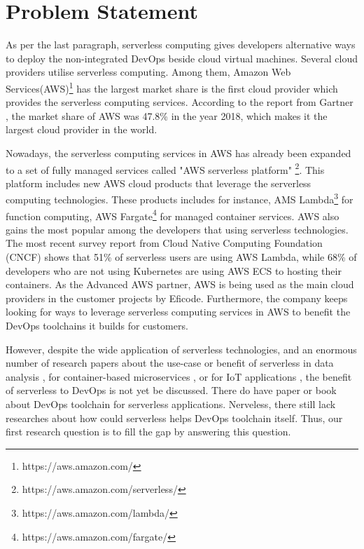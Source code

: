 \section{Problem Statement}
As per the last paragraph, serverless computing gives developers alternative ways to deploy the non-integrated DevOps beside cloud virtual machines. Several cloud providers utilise serverless computing. Among them, Amazon Web Services(AWS)\footnote{https://aws.amazon.com/} has the largest market share is the first cloud provider which provides the serverless computing services. According to the report from Gartner \cite{GartnerS47:online}, the market share of AWS was 47.8\% in the year 2018, which makes it the largest cloud provider in the world.
\par
Nowadays, the serverless computing services in AWS has already been expanded to a set of fully managed services called "AWS serverless platform" \footnote{https://aws.amazon.com/serverless/}. This platform includes new AWS cloud products that leverage the serverless computing technologies. These products includes for instance, AMS Lambda\footnote{https://aws.amazon.com/lambda/} for function computing, AWS Fargate\footnote{https://aws.amazon.com/fargate/} for managed container services.
AWS also gains the most popular among the developers that using serverless technologies. The most recent survey report \cite{cncf2020} from Cloud Native Computing Foundation (CNCF) shows that 51\% of serverless users are using AWS Lambda, while 68\% of developers who are not using Kubernetes are using AWS ECS to hosting their containers.
As the Advanced AWS partner, AWS is being used as the main cloud providers in the customer projects by Eficode. Furthermore, the company keeps looking for ways to leverage serverless computing services in AWS to benefit the DevOps toolchains it builds for customers.
\par
However, despite the wide application of serverless technologies, and an enormous number of research papers about the use-case or benefit of serverless in data analysis \cite{8457831}, for container-based microservices \cite{perez2018serverless}, or for IoT applications \cite{nastic2017serverless} \cite{glikson2017deviceless}, the benefit of serverless to DevOps is not yet be discussed. There do have paper \cite{ivanov2018implementation} or book \cite{bangera2018devops} about DevOps toolchain for serverless applications. Nerveless, there still lack researches about how could serverless helps DevOps toolchain itself. Thus, our first research question is to fill the gap by answering this question. 
